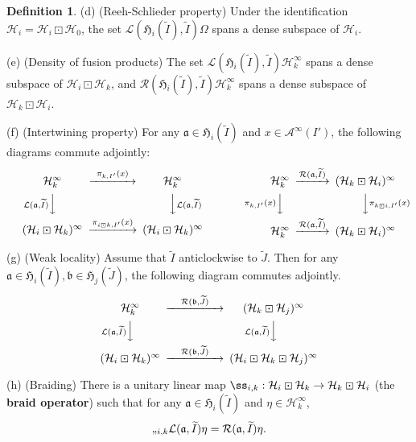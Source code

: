 \documentclass[12pt,a4paper]{article}
\theoremstyle{definition}
\newtheorem{df}{Definition}[subsection]
\theoremstyle{plain}
\newcommand{\fk}{\mathfrak}
\newcommand{\mc}{\mathcal}
\newcommand{\wtd}{\widetilde}
\numberwithin{equation}{subsection}
\begin{document}
\begin{df}
	(d) (Reeh-Schlieder property) Under the identification $\mc H_i=\mc H_i\boxdot\mc H_0$, the set $\mc L(\fk H_i(\wtd I),\wtd I)\Omega$ spans a dense subspace of $\mc H_i$.
	
	(e) (Density of fusion products) The set $\mc L(\fk H_i(\wtd I),\wtd I)\mc H_k^\infty$ spans a dense subspace of $\mc H_i\boxdot\mc H_k$, and $\mc R(\fk H_i(\wtd I),\wtd I)\mc H_k^\infty$ spans a dense subspace of $\mc H_k\boxdot\mc H_i$.
	
(f) (Intertwining property) 	For any $\fk a\in\fk H_i(\wtd I)$ and $x\in\mc A^\infty(I')$, the following diagrams commute adjointly:
\begin{gather}
\begin{CD}
\mc H_k^\infty @>~\pi_{k,I'}(x)~>> \mc H_k^\infty\\
@V \mc L(\fk a,\wtd I)  VV @VV \mc L(\fk a,\wtd I) V\\
(\mc H_i\boxdot\mc H_k)^\infty @> \pi_{i\boxdot k,I'}(x)>> (\mc H_i\boxdot\mc H_k)^\infty
\end{CD}\qquad\qquad\qquad
\begin{CD}
\mc H_k^\infty @> \mc R(\fk a,\wtd I)  >> (\mc H_k\boxdot\mc H_i)^\infty\\
@V \pi_{k,I'}(x) VV @VV \pi_{k\boxdot i,I'}(x) V\\
\mc H_k^\infty @>\mc R(\fk a,\wtd I) >> (\mc H_k\boxdot\mc H_i)^\infty
\end{CD}
\end{gather}
	
	

	(g) (Weak locality) Assume that $\wtd I$ anticlockwise to $\wtd J$. Then for  any $\fk a\in\fk H_i(\wtd I),\fk b\in\fk H_j(\wtd J)$, the following diagram   commutes adjointly.
	\begin{align}
	\begin{CD}
	\mc H_k^\infty @> \quad \mc R(\fk b,\wtd J)\quad   >> (\mc H_k\boxdot\mc H_j)^\infty\\
	@V \mc L(\fk a,\wtd I)   V  V @V \mc L(\fk a,\wtd I) VV\\
	(\mc H_i\boxdot\mc H_k)^\infty @> \quad \mc R(\fk b,\wtd J) \quad  >> (\mc H_i\boxdot\mc H_k\boxdot\mc H_j)^\infty
	\end{CD}
	\end{align}
	
	(h) (Braiding) There is a unitary linear map $\ss_{i,k}:\mc H_i\boxdot\mc H_k\rightarrow\mc H_k\boxdot \mc H_i$ (the \textbf{braid operator}) such that for any  $\fk a\in\fk H_i(\wtd I)$ and $\eta\in\mc H_k^\infty$,
	\begin{align}
	\ss_{i,k} \mc L(\fk a,\wtd I)\eta=\mc R(\fk a,\wtd I)\eta.
	\end{align}
	

\end{df}
\end{document}
